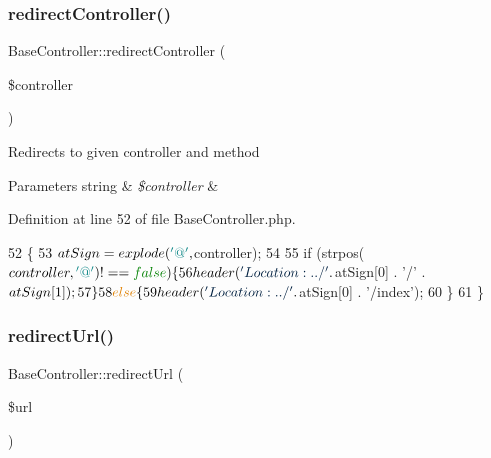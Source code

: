 \subsubsection{\texorpdfstring{redirect\+Controller()}{redirectController()}}
{\footnotesize\ttfamily Base\+Controller\+::redirect\+Controller (\begin{DoxyParamCaption}\item[{}]{\$controller }\end{DoxyParamCaption})\hspace{0.3cm}{\ttfamily [protected]}}

Redirects to given controller and method


\begin{DoxyParams}[1]{Parameters}
string & {\em \$controller} & \\
\hline
\end{DoxyParams}


Definition at line 52 of file Base\+Controller.\+php.


\begin{DoxyCode}
52                                                        \{
53         $atSign = explode(\textcolor{charliteral}{'@'}, $controller);
54 
55         \textcolor{keywordflow}{if} (strpos($controller, \textcolor{charliteral}{'@'}) !== \textcolor{keyword}{false}) \{
56             header(\textcolor{stringliteral}{'Location:../'} . $atSign[0] . \textcolor{charliteral}{'/'} . $atSign[1]);
57         \}
58         \textcolor{keywordflow}{else} \{
59             header(\textcolor{stringliteral}{'Location:../'} . $atSign[0] . \textcolor{stringliteral}{'/index'});
60         \}
61     \}
\end{DoxyCode}
\hypertarget{class_base_controller_a73ab7b9209ca7fd12d9f8d2114c1c825}{}\label{class_base_controller_a73ab7b9209ca7fd12d9f8d2114c1c825} 
\subsubsection{\texorpdfstring{redirect\+Url()}{redirectUrl()}}
{\footnotesize\ttfamily Base\+Controller\+::redirect\+Url (\begin{DoxyParamCaption}\item[{}]{\$url }\end{DoxyParamCaption})\hspace{0.3cm}{\ttfamily [protected]}}

